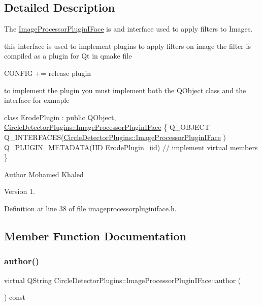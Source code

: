\subsection{Detailed Description}
The \hyperlink{class_circle_detector_plugins_1_1_image_processor_plugin_i_face}{Image\+Processor\+Plugin\+I\+Face} is and interface used to apply filters to Images. 

this interface is used to implement plugins to apply filters on image the filter is compiled as a plugin for Qt in qmake file 
\begin{DoxyCode}
CONFIG += release plugin
\end{DoxyCode}
 to implement the plugin you must implement both the Q\+Object class and the interface for exmaple 
\begin{DoxyCode}
 \textcolor{keyword}{class }ErodePlugin : \textcolor{keyword}{public} QObject, 
      \hyperlink{class_circle_detector_plugins_1_1_image_processor_plugin_i_face}{CircleDetectorPlugins::ImageProcessorPluginIFace}
\{
   Q\_OBJECT
   Q\_INTERFACES(\hyperlink{class_circle_detector_plugins_1_1_image_processor_plugin_i_face}{CircleDetectorPlugins::ImageProcessorPluginIFace}
      )
   Q\_PLUGIN\_METADATA(IID ErodePlugin\_iid)
  \textcolor{comment}{// implement virtual members}
 \}
\end{DoxyCode}


\begin{DoxyAuthor}{Author}
Mohamed Khaled 
\end{DoxyAuthor}
\begin{DoxyVersion}{Version}
1. 
\end{DoxyVersion}


Definition at line 38 of file imageprocessorpluginiface.\+h.



\subsection{Member Function Documentation}
\mbox{\label{class_circle_detector_plugins_1_1_image_processor_plugin_i_face_a74b5e4f7aa50140ecc4a94587fb3ed42}} 
\subsubsection{\texorpdfstring{author()}{author()}}
{\footnotesize\ttfamily virtual Q\+String Circle\+Detector\+Plugins\+::\+Image\+Processor\+Plugin\+I\+Face\+::author (\begin{DoxyParamCaption}{ }\end{DoxyParamCaption}) const\hspace{0.3cm}{\ttfamily [pure virtual]}}




